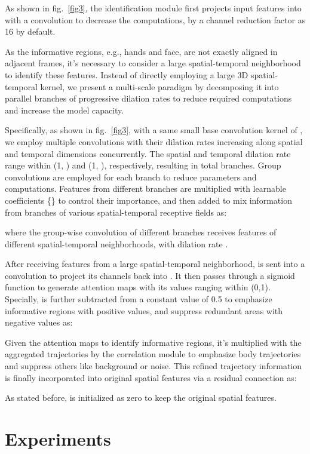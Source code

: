 \documentclass[10pt,twocolumn,letterpaper]{article}
\begin{document}
As shown in fig.~\ref{fig3}, the identification module first projects input features  into  with a  convolution to decrease the computations, by a channel reduction factor  as 16 by default.

As the informative regions, e.g., hands and face, are not exactly aligned in adjacent frames, it's necessary to consider a large spatial-temporal neighborhood to identify these features. Instead of directly employing a large 3D spatial-temporal kernel, we present a multi-scale paradigm by decomposing it into parallel branches of progressive dilation rates to reduce required computations and increase the model capacity. 

Specifically, as shown in fig.~\ref{fig3}, with a same small base convolution kernel of , we employ multiple convolutions with their dilation rates increasing along spatial and temporal dimensions concurrently. The spatial and temporal dilation rate range within (1, ) and (1, ), respectively, resulting in total  branches. Group convolutions are employed for each branch to reduce parameters and computations. Features from different branches are multiplied with learnable coefficients \{\} to control their importance, and then added to mix information from branches of various spatial-temporal receptive fields as:

where the group-wise convolution  of different branches receives features of different spatial-temporal neighborhoods, with dilation rate .

After receiving features from a large spatial-temporal neighborhood,  is sent into a  convolution to project its channels back into . It then passes through a sigmoid function to generate attention maps  with its values ranging within (0,1). Specially,  is further subtracted from a constant value of 0.5 to emphasize informative regions with positive values, and suppress redundant areas with negative values as:


Given the attention maps  to identify informative regions, it's multiplied with the aggregated trajectories  by the correlation module to emphasize body trajectories and suppress others like background or noise. This refined trajectory information is finally incorporated into original spatial features  via a residual connection as:

As stated before,  is initialized as zero to keep the original spatial features.



\section{Experiments}
\end{document}
